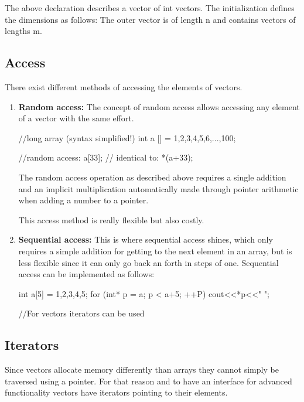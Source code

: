 \documentclass[10pt,a4paper]{scrartcl}
\begin{document}
\begin{multicols*}{2}
The above declaration describes a vector of int vectors. The initialization defines the dimensions as follows: The outer vector is of length n and contains vectors of lengths m.

\subsection{Access}

There exist different methods of accessing the elements of vectors.

\begin{enumerate}
\item \textbf{Random access:} The concept of random access allows accessing any element of a vector with the same effort.

\begin{TPCpp}
//long array (syntax simplified!)
int a [] = {1,2,3,4,5,6,...,100};

//random access:
a[33]; // identical to: *(a+33);
\end{TPCpp}

The random access operation as described above requires a single addition and an implicit multiplication automatically made through pointer arithmetic when adding a number to a pointer.

This access method is really flexible but also costly.
\item \textbf{Sequential access:} This is where sequential access shines, which only requires a simple addition for getting to the next element in an array, but is less flexible since it can only go back an forth in steps of one. Sequential access can be implemented as follows:

\begin{TPCpp}
int a[5] = {1,2,3,4,5};
for (int* p = a; p < a+5; ++P)
	cout<<*p<<" ";
	
//For vectors iterators can be used

\end{TPCpp}
\end{enumerate}

\subsection{Iterators}

Since vectors allocate memory differently than arrays they cannot simply be traversed using a pointer. For that reason and to have an interface for advanced functionality vectors have iterators pointing to their elements.


\end{multicols*}
\end{document}
